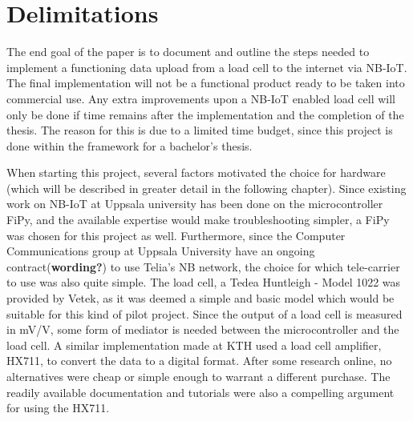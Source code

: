 \section{Delimitations}
\iffalse
\begin{itemize}
	\item Scale down expectations and clarify %
	\item Explain the choice of components %
	\item Explain scope %
\end{itemize}
\fi
The end goal of the paper is to document and outline the steps needed to implement a functioning data upload from a load cell to the internet via NB-IoT. The final implementation will not be a functional product ready to be taken into commercial use. Any extra improvements upon a NB-IoT enabled load cell will only be done if time remains after the implementation and the completion of the thesis. The reason for this is due to a limited time budget, since this project is done within the framework for a bachelor's thesis.

When starting this project, several factors motivated the choice for hardware (which will be described in greater detail in the following chapter). Since existing work on NB-IoT at Uppsala university has been done on the microcontroller FiPy, and the available expertise would make troubleshooting simpler, a FiPy was chosen for this project as well. Furthermore, since the Computer Communications group at Uppsala University have an ongoing contract(\textbf{wording?}) to use Telia's NB network, the choice for which tele-carrier to use was also quite simple. The load cell, a Tedea Huntleigh - Model 1022 was provided by Vetek, as it was deemed a simple and basic model which would be suitable for this kind of pilot project. Since the output of a load cell is measured in mV/V\cite{load-cell-spec}, some form of mediator is needed between the microcontroller and the load cell. A similar implementation made at KTH \cite{hospital} used a load cell amplifier, HX711, to convert the data to a digital format. After some research online, no alternatives were cheap or simple enough to warrant a different purchase. The readily available documentation and tutorials were also a compelling argument for using the HX711. 


